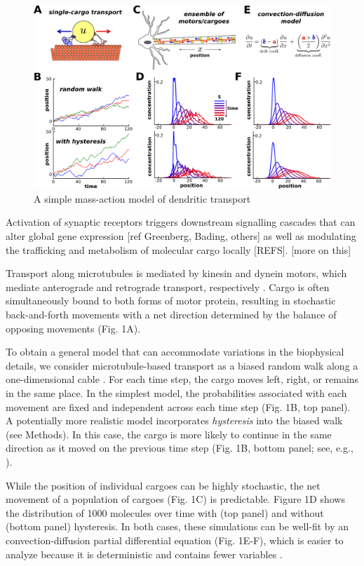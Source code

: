 \documentclass[10pt]{wlpeerj}
\begin{document}
\begin{figure}[!tb]
\begin{center}
\includegraphics[width=0.9\columnwidth]{00_stochastic.png}
\caption{A simple mass-action model of dendritic transport}
\end{center}
\end{figure}

Activation of synaptic receptors triggers downstream signalling cascades that can alter global gene expression [ref Greenberg, Bading, others] as well as modulating the trafficking and metabolism of molecular cargo locally [REFS]. [more on this]

Transport along microtubules is mediated by kinesin and dynein motors, which mediate anterograde and retrograde transport, respectively \citep{Hirokawa_2010,Gagnon_2011}.
Cargo is often simultaneously bound to both forms of motor protein, resulting in stochastic back-and-forth movements with a net direction determined by the balance of opposing movements \citep{Hancock_2014,Buxbaum_2014b} (Fig. 1A).

To obtain a general model that can accommodate variations in the biophysical details, we consider microtubule-based transport as a biased random walk along a one-dimensional cable \citep{Bressloff_2006,Newby_2010,Bressloff_2009}.
For each time step, the cargo moves left, right, or remains in the same place.
In the simplest model, the probabilities associated with each movement are fixed and independent across each time step (Fig. 1B, top panel).
A potentially more realistic model incorporates \textit{hysteresis} into the biased walk (see Methods). In this case, the cargo is more likely to continue in the same direction as it moved on the previous time step (Fig. 1B, bottom panel; see, e.g., \cite{Soundararajan_2014}).

While the position of individual cargoes can be highly stochastic, the net movement of a population of cargoes (Fig. 1C) is predictable.
Figure 1D shows the distribution of 1000 molecules over time with (top panel) and without (bottom panel) hysteresis.
In both cases, these simulations can be well-fit by an convection-diffusion partial differential equation (Fig. 1E-F), which is easier to analyze because it is deterministic and contains fewer variables \citep{Smith_2001}.
\end{document}
